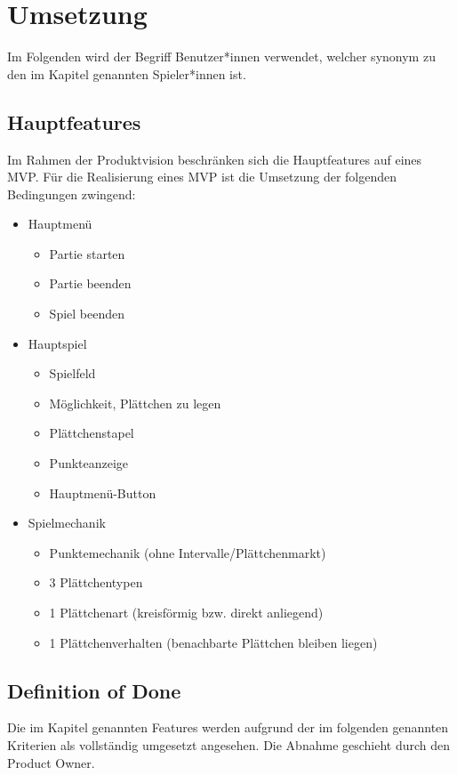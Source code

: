 \documentclass[../main.tex]{subfiles}
\begin{document}
	\section{Umsetzung}
	Im Folgenden wird der Begriff Benutzer*innen verwendet, welcher synonym zu den im Kapitel  genannten Spieler*innen ist.
	
	\subsection{Hauptfeatures}
	\label{section:Hauptfeatures}
	\par Im Rahmen der Produktvision beschränken sich die Hauptfeatures auf eines MVP.  Für die Realisierung eines MVP ist die Umsetzung der folgenden Bedingungen zwingend:
	\begin{itemize}
		\item Hauptmenü
		\begin{itemize}
			\item Partie starten
			\item Partie beenden
			\item Spiel beenden
		\end{itemize}
		\item Hauptspiel
		\begin{itemize}
			\item Spielfeld
			\item Möglichkeit, Plättchen zu legen
			\item Plättchenstapel
			\item Punkteanzeige
			\item Hauptmenü-Button
		\end{itemize}
		\item Spielmechanik
		\begin{itemize}
			\item Punktemechanik (ohne Intervalle/Plättchenmarkt)
			\item 3 Plättchentypen
			\item 1 Plättchenart (kreisförmig bzw. direkt anliegend)
			\item 1 Plättchenverhalten (benachbarte Plättchen bleiben liegen)
		\end{itemize}
	\end{itemize}

	\subsection{Definition of Done}
	\label{section:DefinitionOfDone}
	\par Die im Kapitel  genannten Features werden aufgrund der im folgenden genannten Kriterien als vollständig umgesetzt angesehen. Die Abnahme geschieht durch den Product Owner.
	
\end{document}
